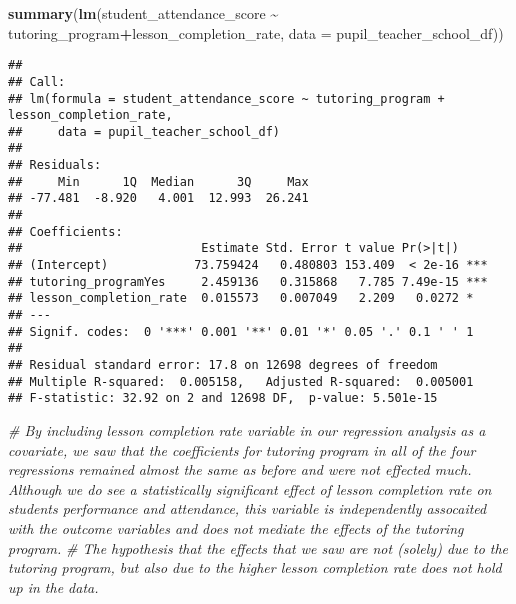 \documentclass[
]{article}
\newenvironment{Shaded}{\begin{snugshade}}{\end{snugshade}}
\newcommand{\AttributeTok}[1]{\textcolor[rgb]{0.13,0.29,0.53}{#1}}
\newcommand{\CommentTok}[1]{\textcolor[rgb]{0.56,0.35,0.01}{\textit{#1}}}
\newcommand{\FunctionTok}[1]{\textcolor[rgb]{0.13,0.29,0.53}{\textbf{#1}}}
\newcommand{\NormalTok}[1]{#1}
\newcommand{\SpecialCharTok}[1]{\textcolor[rgb]{0.81,0.36,0.00}{\textbf{#1}}}
\begin{document}
\begin{Shaded}
\begin{Highlighting}[]
\FunctionTok{summary}\NormalTok{(}\FunctionTok{lm}\NormalTok{(student\_attendance\_score }\SpecialCharTok{\textasciitilde{}}\NormalTok{ tutoring\_program}\SpecialCharTok{+}\NormalTok{lesson\_completion\_rate, }\AttributeTok{data =}\NormalTok{ pupil\_teacher\_school\_df))}
\end{Highlighting}
\end{Shaded}

\begin{verbatim}
## 
## Call:
## lm(formula = student_attendance_score ~ tutoring_program + lesson_completion_rate, 
##     data = pupil_teacher_school_df)
## 
## Residuals:
##     Min      1Q  Median      3Q     Max 
## -77.481  -8.920   4.001  12.993  26.241 
## 
## Coefficients:
##                         Estimate Std. Error t value Pr(>|t|)    
## (Intercept)            73.759424   0.480803 153.409  < 2e-16 ***
## tutoring_programYes     2.459136   0.315868   7.785 7.49e-15 ***
## lesson_completion_rate  0.015573   0.007049   2.209   0.0272 *  
## ---
## Signif. codes:  0 '***' 0.001 '**' 0.01 '*' 0.05 '.' 0.1 ' ' 1
## 
## Residual standard error: 17.8 on 12698 degrees of freedom
## Multiple R-squared:  0.005158,   Adjusted R-squared:  0.005001 
## F-statistic: 32.92 on 2 and 12698 DF,  p-value: 5.501e-15
\end{verbatim}

\begin{Shaded}
\begin{Highlighting}[]
\CommentTok{\# By including lesson completion rate variable in our regression analysis as a covariate, we saw that the coefficients for tutoring program in all of the four regressions remained almost the same as before and were not effected much. Although we do see a statistically significant effect of lesson completion rate on students performance and attendance, this variable is independently assocaited with the outcome variables and does not mediate the effects of the tutoring program.}
\CommentTok{\# The hypothesis that the effects that we saw are not (solely) due to the tutoring program, but also due to the higher lesson completion rate does not hold up in the data.}
\end{Highlighting}
\end{Shaded}
\end{document}
